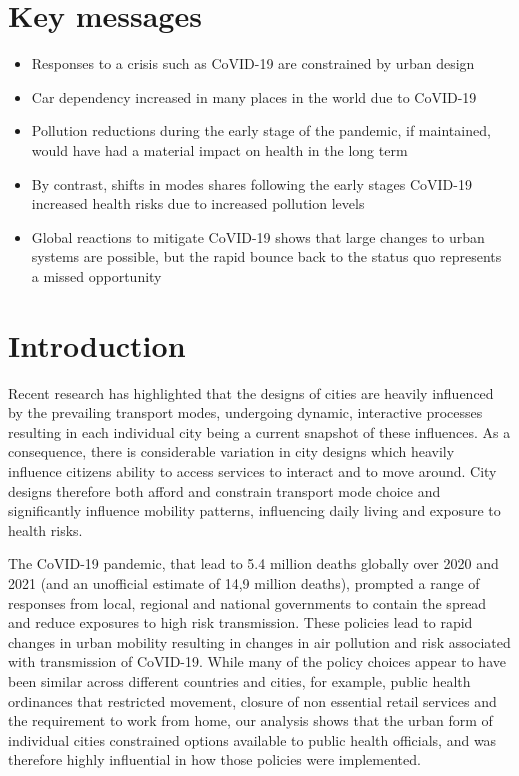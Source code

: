 \documentclass[preprint,12pt]{elsarticle}
\begin{document}
\section*{Key messages}
\begin{itemize}
    \item[]  Responses to a crisis such as CoVID-19 are constrained by urban design
    \item[] Car dependency increased in many places in the world due to CoVID-19
    \item[] Pollution reductions during the early stage of the pandemic, if maintained, would have had a material impact on health in the long term
    \item[] By contrast, shifts in modes shares following the early stages CoVID-19 increased health risks due to increased pollution levels
    \item[] Global reactions to mitigate CoVID-19 shows that large changes to urban systems are possible, but the rapid bounce back to the status quo represents a missed opportunity
\end{itemize}


\section*{Introduction}

Recent research has highlighted that the designs of cities are heavily influenced by the prevailing transport modes\cite{KNOWLES2020102607}, undergoing dynamic, interactive processes \cite{Strano2012} resulting in each individual city being a current snapshot of these influences. As a consequence, there is considerable variation in city designs which heavily influence citizens ability to access services to interact and to move around\cite{Thompson2020}. City designs therefore both afford and constrain transport mode choice and significantly influence mobility patterns, influencing daily living and exposure to health risks\cite{WHO2023}.

The CoVID-19 pandemic, that lead to 5.4 million deaths globally over 2020 and 2021 (and an unofficial estimate of 14,9 million deaths)\cite{Taylor2022}, prompted a range of responses from local, regional and national governments\cite{Hunter2023LPH} to contain the spread and reduce exposures to high risk transmission. These policies lead to rapid changes in urban mobility resulting in changes in air pollution and risk associated with transmission of CoVID-19\cite{Forster2020,He2020,LeQuere2020,Venter2020,thompson2022modelling}. While many of the policy choices appear to have been similar across different countries and cities, for example, public health ordinances that restricted movement, closure of non essential retail services and the requirement to work from home\cite{hale2021global}, our analysis shows that the urban form of individual cities constrained options available to public health officials, and was therefore highly influential in how those policies were implemented.
\end{document}
